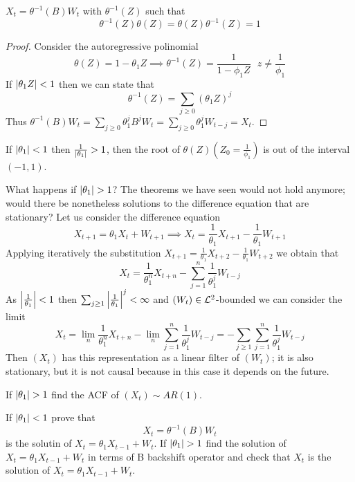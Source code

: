 \begin{proposition}
    $X_t=\theta^{-1}(B)W_t$ with $\theta^{-1}(Z)$ such that
    \[
        \theta^{-1}(Z)\theta(Z)=\theta(Z)\theta^{-1}(Z)=1  
    \]
\end{proposition}

\begin{proof}
    Consider the autoregressive polinomial
    \[
        \theta(Z)=1-\theta_1Z\implies\theta^{-1}(Z)=\frac{1}{1-\phi_1Z}\ \ \ z\ne\frac{1}{\phi_1} 
    \]
    If $\left|\theta_1Z\right|<1$ then we can state that
    \[
        \theta^{-1}(Z)=\sum_{j\ge0}(\theta_1Z)^j  
    \]
    Thus $\theta^{-1}(B)W_t=\sum_{j\ge0}\theta_1^jB^jW_t=\sum_{j\ge0}\theta_1^jW_{t-j}=X_t$.
\end{proof}

\begin{remark}
    If $\left|\theta_1\right|<1$ then $\frac{1}{\left|\theta_1\right|}>1$, then the root of $\theta(Z)(Z_0=\frac{1}{\phi_1})$ is out of the interval $(-1,1)$.
\end{remark}

What happens if $\abs{\theta_1}>1$? The theorems we have seen would not hold anymore; would there be nonetheless solutions to the difference equation that are stationary? Let us consider the difference equation
\[
    X_{t+1}=\theta_1X_t+W_{t+1}\implies X_t=\frac{1}{\theta_1}X_{t+1}-\frac{1}{\theta_1}W_{t+1}  
\]
Applying iteratively the substitution $X_{t+1}=\frac{1}{\theta_1}X_{t+2}-\frac{1}{\theta_1}W_{t+2}$ we obtain that
\[
    X_t=\frac{1}{\theta_1^n}X_{t+n}-\sum_{j=1}^n\frac{1}{\theta_1^j}W_{t-j}  
\]
As $\left|\frac{1}{\theta_1}\right|<1$ then $\sum_{j\ge1}\left|\frac{1}{\theta_1}\right|^j<\infty$ and $(W_t)\in\mathcal{L}^{2}$-bounded we can consider the limit
\[
      X_t=\lim_n\frac{1}{\theta_1^n}X_{t+n}-\lim_n\sum_{j=1}^n\frac{1}{\theta_1^j}W_{t-j}=-\sum_{j\ge1}\sum_{j=1}^n\frac{1}{\theta_1^j}W_{t-j}
\]
Then $(X_t)$ has this representation as a linear filter of $(W_t)$; it is also stationary, but it is not causal because in this case it depends on the future.

\begin{exercise}
    If $\abs{\theta_1}>1$ find the ACF of $(X_t)\sim AR(1)$.
\end{exercise}

\begin{exercise}
    If $\left|\theta_1\right|<1$ prove that
    \[
        X_t=\theta^{-1}(B)W_t  
    \]
    is the solutin of $X_t=\theta_1X_{t-1}+W_t$. If $\abs{\theta_1}>1$ find the solution of $X_t=\theta_1X_{t-1}+W_t$ in terms of B backshift operator and check that $X_t$ is the solution of $X_t=\theta_1X_{t-1}+W_t$.
\end{exercise}